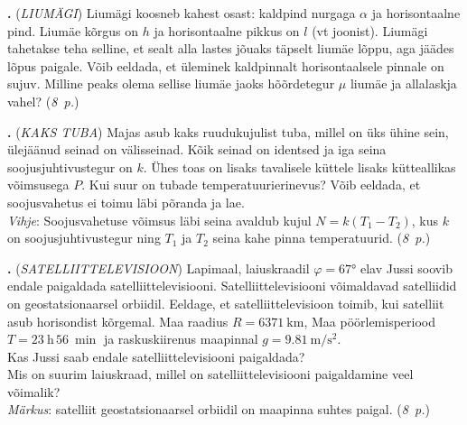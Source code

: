 \documentclass[11pt,a5paper]{article}
\newcommand{\numb}[1]{\vspace{5pt}\textbf{\large #1}}
\newcommand{\nimi}[1]{(\textsl{\small #1})}
\newcommand{\punktid}[1]{(\emph{#1~p.})}
\newcounter{ylesanne}
\newcommand{\yl}[1]{\addtocounter{ylesanne}{1}\numb{\theylesanne.} \nimi{#1} \newblock{}}
\newcommand{\autor}[1]{}%
\begin{document}
\yl{LIUMÄGI}
Liumägi koosneb kahest osast: kaldpind nurgaga $\alpha$ ja horisontaalne pind. Liumäe kõrgus on $h$ ja horisontaalne pikkus on $l$ (vt joonist). Liumägi tahetakse teha selline, et sealt alla lastes jõuaks täpselt liumäe lõppu, aga jäädes lõpus paigale. Võib eeldada, et üleminek kaldpinnalt horisontaalsele pinnale on sujuv. Milline peaks olema sellise liumäe jaoks hõõrdetegur $\mu$ liumäe ja allalaskja vahel?
\punktid{8} \autor{Kaarel Kivisalu}
\begin{figure}[h]
  \vspace{-1.5em}
  \centering
  {
  }
  \vspace{-2em}
\end{figure}

\yl{KAKS TUBA}
Majas asub kaks ruudukujulist tuba, millel on üks ühine sein, ülejäänud seinad on välisseinad. Kõik seinad on identsed ja iga seina soojusjuhtivustegur on $k$. Ühes toas on lisaks tavalisele küttele lisaks kütteallikas võimsusega $P$. Kui suur on tubade temperatuurierinevus? Võib eeldada, et soojusvahetus ei toimu läbi põranda ja lae.
\\\emph{Vihje}: Soojusvahetuse võimsus läbi seina avaldub kujul $N=k(T_1-T_2)$, kus $k$ on soojusjuhtivustegur ning $T_1$ ja $T_2$ seina kahe pinna temperatuurid.
\punktid{8} \autor{Jarl Patrick Paide}

\yl{SATELLIITTELEVISIOON}
Lapimaal, laiuskraadil $\varphi =\ang{67}$ elav Jussi soovib endale paigaldada satelliittelevisiooni. Satelliittelevisiooni võimaldavad satelliidid on geostatsionaarsel orbiidil. Eeldage, et satelliittelevisioon toimib, kui satelliit asub horisondist kõrgemal. Maa raadius $R=\qty{6371}{\km}$, Maa pöörlemisperiood $T=\qty{23}{\hour}\, \qty{56}{\min}$ ja raskuskiirenus maapinnal $g= \qty{9.81}{\m\per\s\squared}$.\\
\osa Kas Jussi saab endale satelliittelevisiooni paigaldada?\\
\osa Mis on suurim laiuskraad, millel on satelliittelevisiooni paigaldamine veel võimalik?
\\ \emph{Märkus}: satelliit geostatsionaarsel orbiidil on maapinna suhtes paigal.
\punktid{8} \autor{Krister Kasemaa}
\end{document}
